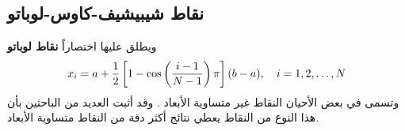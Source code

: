 \subsection[نقاط شيبيشيف-كاوس-لوباتو]{نقاط شيبيشيف-كاوس-لوباتو }
ويطلق عليها اختصاراً \textbf{نقاط لوباتو }
\begin{equation}
	\label{eq:lobatto-points}
	x_i=a+\frac{1}{2}\left[1-\cos\left(\frac{i-1}{N-1}\right)\pi\right](b-a),\quad i=1,2,\dots,N
\end{equation}
وتسمى في بعض الأحيان النقاط غير متساوية الأبعاد . وقد أثبت العديد من الباحثين بأن هذا النوع من النقاط يعطي نتائج أكثر دقة من النقاط متساوية الأبعاد.





